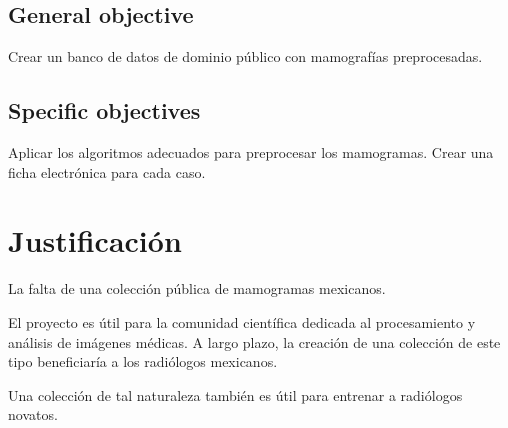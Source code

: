 \subsection{General objective}

Crear un banco de datos de dominio público con mamografías preprocesadas.

\subsection{Specific objectives}

Aplicar los algoritmos adecuados para preprocesar los mamogramas.
Crear una ficha electrónica para cada caso.

\section{Justificación}

La falta de una colección pública de mamogramas mexicanos.

El proyecto es útil para la comunidad científica dedicada al procesamiento y
análisis de imágenes médicas. A largo plazo, la creación de una colección de
este tipo beneficiaría a los radiólogos mexicanos.

Una colección de tal naturaleza también es útil para entrenar a radiólogos
novatos.
